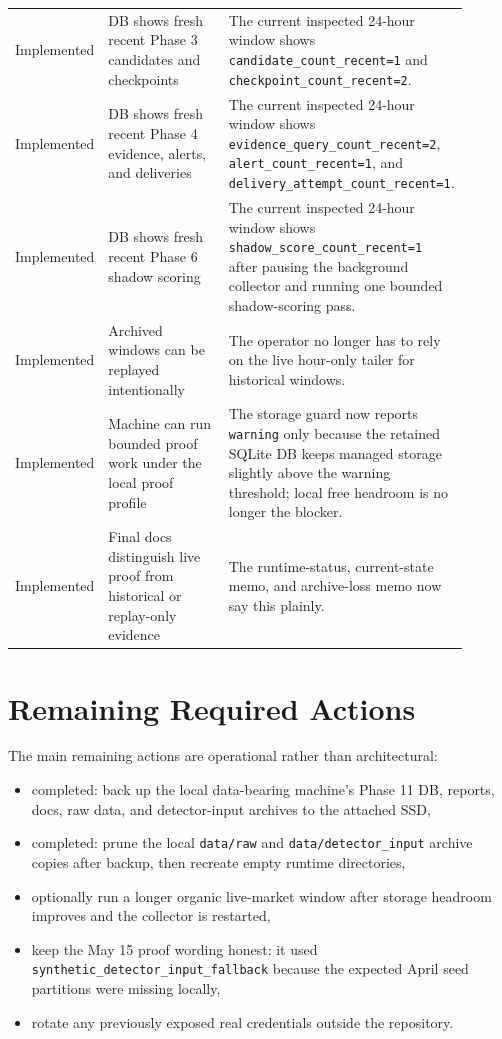 \documentclass{article}
\begin{document}
\begin{longtable}{p{0.18\linewidth}p{0.52\linewidth}p{0.20\linewidth}}
Implemented & DB shows fresh recent Phase 3 candidates and checkpoints & The current inspected 24-hour window shows \texttt{candidate\_count\_recent=1} and \texttt{checkpoint\_count\_recent=2}. \\
Implemented & DB shows fresh recent Phase 4 evidence, alerts, and deliveries & The current inspected 24-hour window shows \texttt{evidence\_query\_count\_recent=2}, \texttt{alert\_count\_recent=1}, and \texttt{delivery\_attempt\_count\_recent=1}. \\
Implemented & DB shows fresh recent Phase 6 shadow scoring & The current inspected 24-hour window shows \texttt{shadow\_score\_count\_recent=1} after pausing the background collector and running one bounded shadow-scoring pass. \\
Implemented & Archived windows can be replayed intentionally & The operator no longer has to rely on the live hour-only tailer for historical windows. \\
Implemented & Machine can run bounded proof work under the local proof profile & The storage guard now reports \texttt{warning} only because the retained SQLite DB keeps managed storage slightly above the warning threshold; local free headroom is no longer the blocker. \\
Implemented & Final docs distinguish live proof from historical or replay-only evidence & The runtime-status, current-state memo, and archive-loss memo now say this plainly. \\
\end{longtable}

\section*{Remaining Required Actions}
The main remaining actions are operational rather than architectural:
\begin{itemize}
\item completed: back up the local data-bearing machine's Phase 11 DB, reports, docs, raw data, and detector-input archives to the attached SSD,
\item completed: prune the local \texttt{data/raw} and \texttt{data/detector\_input} archive copies after backup, then recreate empty runtime directories,
\item optionally run a longer organic live-market window after storage headroom improves and the collector is restarted,
\item keep the May 15 proof wording honest: it used \texttt{synthetic\_detector\_input\_fallback} because the expected April seed partitions were missing locally,
\item rotate any previously exposed real credentials outside the repository.
\end{itemize}
\end{document}
